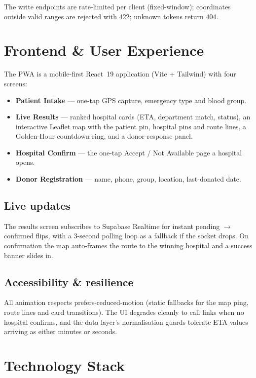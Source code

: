 \documentclass[11pt]{article}
\newcommand{\code}[1]{\colorbox{ghCodeBg}{\ttfamily\small #1}}
\begin{document}
\noindent The write endpoints are rate-limited per client (fixed-window); coordinates
outside valid ranges are rejected with \code{422}; unknown tokens return \code{404}.

\section{Frontend \& User Experience}

The PWA is a mobile-first React~19 application (Vite + Tailwind) with four screens:

\begin{itemize}
  \item \textbf{Patient Intake} --- one-tap GPS capture, emergency type and blood group.
  \item \textbf{Live Results} --- ranked hospital cards (ETA, department match, status),
  an interactive Leaflet map with the patient pin, hospital pins and route lines, a
  Golden-Hour countdown ring, and a donor-response panel.
  \item \textbf{Hospital Confirm} --- the one-tap Accept / Not Available page a hospital opens.
  \item \textbf{Donor Registration} --- name, phone, group, location, last-donated date.
\end{itemize}

\subsection{Live updates}
The results screen subscribes to Supabase Realtime for instant
\code{pending $\rightarrow$ confirmed} flips, with a 3-second polling loop as a
fallback if the socket drops. On confirmation the map auto-frames the route to the
winning hospital and a success banner slides in.

\subsection{Accessibility \& resilience}
All animation respects \code{prefers-reduced-motion} (static fallbacks for the
map ping, route lines and card transitions). The UI degrades cleanly to call links
when no hospital confirms, and the data layer's normalisation guards tolerate ETA
values arriving as either minutes or seconds.

\section{Technology Stack}
\end{document}
